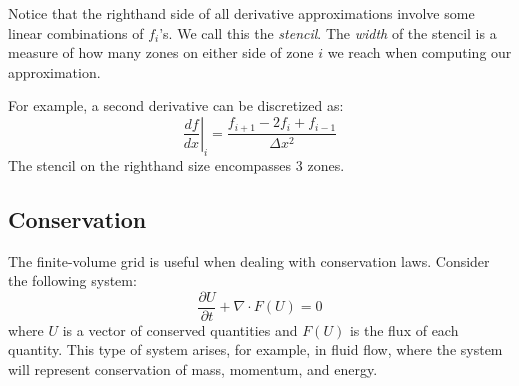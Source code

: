 Notice that the righthand side of all derivative approximations involve
some linear combinations of $f_i$'s.  We call this the {\em stencil}.
The {\em width} of the stencil is a measure of how many zones on
either side of zone $i$ we reach when computing our approximation.

For example, a second derivative can be discretized as:
\begin{equation}
\left . \frac{df}{dx} \right |_i = \frac{f_{i+1} - 2 f_i + f_{i-1}}{\Delta x^2}
\end{equation}
The stencil on the righthand size encompasses 3 zones.

\subsection{Conservation}

The finite-volume grid is useful when dealing with conservation laws.
Consider the following system:
\begin{equation}
\frac{\partial U}{\partial t} + \nabla \cdot F(U) = 0
\end{equation}
where $U$ is a vector of conserved quantities and $F(U)$ is the flux
of each quantity.  This type of system arises, for example, in fluid
flow, where the system will represent conservation of mass, momentum,
and energy.

